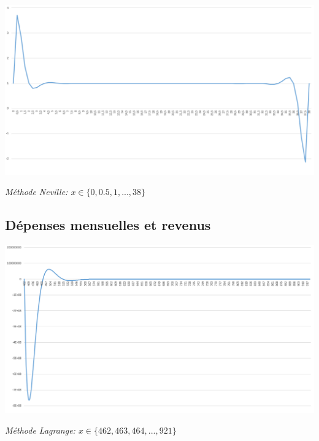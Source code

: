 \documentclass[10pt,a4paper,french]{article}
\begin{document}
\begin{center}
\includegraphics[scale=0.25]{ressources/neville_1.PNG}
\end{center}
\begin{center}
\textit{Méthode Neville: $x\in \{0,0.5,1,...,38\}$ }
\end{center}

\subsection{Dépenses mensuelles et revenus}

\begin{center}
\includegraphics[scale=0.25]{ressources/lagrange_2.PNG}
\end{center}
\begin{center}
\textit{Méthode Lagrange: $x\in \{462,463,464,...,921\}$ }
\end{center}
\end{document}
